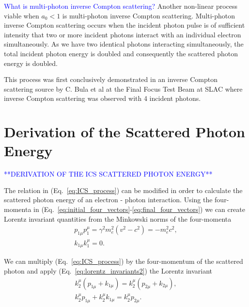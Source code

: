 \documentclass[../main.tex]{subfiles}
\begin{document}
\textcolor{blue}{What is multi-photon inverse Compton scattering?}
Another non-linear process viable when $a_{0} < 1$ is multi-photon inverse Compton scattering. Multi-photon inverse Compton scattering occurs when the incident photon pulse is of sufficient intensity that two or more incident photons interact with an individual electron simultaneously. As we have two identical photons interacting simultaneously, the total incident photon energy is doubled and consequently the scattered photon energy is doubled.

This process was first conclusively demonstrated in an inverse Compton scattering source by C. Bula et al \cite{bula1996observation} at the Final Focus Test Beam at SLAC \cite{burke1994results} where inverse Compton scattering was observed with 4 incident photons.



\section{Derivation of the Scattered Photon Energy}
\label{sec:derivation_of_the_scattered_photon_energy}
\textcolor{blue}{**DERIVATION OF THE ICS SCATTERED PHOTON ENERGY**}

The relation in (Eq.~\ref{eq:ICS_process}) can be modified in order to calculate the scattered photon energy of an electron - photon interaction. Using the four-momenta in (Eq.~\ref{eq:initial_four_vectors}-\ref{eq:final_four_vectors}) we can create Lorentz invariant quantities from the Minkowski norms of the four-momenta 
\begin{gather}
p_{1\mu}p_{1}^{\mu} = \gamma^{2}m_{e}^{2}\left(v^{2}-c^{2}\right) = -m_{e}^{2}c^{2},
\label{eq:lorentz_invariants1} \\
k_{1\mu}k_{1}^{\mu} = 0.
\label{eq:lorentz_invariants2}
\end{gather}

We can multiply (Eq.~\ref{eq:ICS_process}) by the four-momentum  of the scattered photon and apply (Eq.~\ref{eq:lorentz_invariants2}) the Lorentz invariant 
\begin{gather}
k_{2}^{\mu}\left(p_{1\mu} + k_{1\mu}\right) = k_{2}^{\mu}\left(p_{2\mu} + k_{2\mu}\right), \\
k_{2}^{\mu}p_{1\mu}+k_{2}^{\mu}k_{1\mu} = k_{2}^{\mu}p_{2\mu}.
\label{eq:apply_photon_pfinal}
\end{gather}
\end{document}
